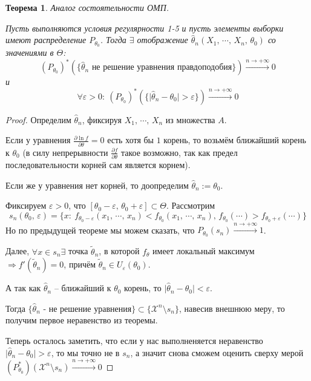 \documentclass[a4paper,12pt]{article}
\theoremstyle{plain}
\newtheorem{theorem}{Теорема}[section]
\theoremstyle{definition}
\theoremstyle{remark}
\begin{document}
\begin{theorem}
  Аналог состоятельности ОМП.

  Пусть выполняются условия регулярности 1-5 и пусть элементы выборки имеют распределение $P_{\theta_0}$. Тогда $\exists$ отображение $\hat{\theta}_n(X_1,\,\cdots,\,X_n,\,\theta_0)$ со значениями в $\Theta$:
  \[
    (P_{\theta_0})^*(\{\hat{\theta}_n \text{ не решение уравнения правдоподобия}\}) \overset{n \to +\infty}{\to} 0
  \]
  и
  \[
    \forall \varepsilon > 0 :\: (P_{\theta_0})^*(\{\vert\hat{\theta}_n - \theta_0\vert > \varepsilon\}) \overset{n \to +\infty}{\to} 0
  \]
\end{theorem}

\begin{proof}
  Определим $\hat{\theta}_n$, фиксируя $X_1,\,\cdots,\,X_n$ из множества $A$.

  Если у уравнения $\frac{\partial\ln f}{\partial\theta} = 0$ есть хотя бы $1$ корень, то возьмём ближайший корень к $\theta_0$ (в силу непрерывности $\frac{\partial f}{\partial \theta}$ такое возможно, так как предел последовательности корней сам является корнем).

  Если же у уравнения нет корней, то доопределим $\hat{\theta}_n := \theta_0$.

  Фиксируем $\varepsilon > 0$, что $[\theta_0 - \varepsilon,\, \theta_0 + \varepsilon] \subset \Theta$. Рассмотрим
  \[
    s_n(\theta_0,\, \varepsilon) = \{x :\: f_{\theta_0 - \varepsilon}(x_1,\,\cdots,\,x_n) < f_{\theta_0}(x_1,\,\cdots,\,x_n),\, f_{\theta_0}(\cdots) > f_{\theta_0 + \varepsilon}(\cdots)\}
  \]
  Но по предыдущей теореме мы можем сказать, что $P_{\theta_0}(s_n) \overset{n \to +\infty}{\to} 1$.

  Далее, $\forall x \in s_n \exists$ точка $\tilde{\theta}_n$, в которой $f_\theta$ имеет локальный максимум $\Rightarrow f'(\tilde{\theta}_n) = 0$, причём $\tilde{\theta}_n \in U_\varepsilon(\theta_0)$.

  А так как $\hat{\theta}_n$ -- ближайший к $\theta_0$ корень, то $\vert\hat{\theta}_n - \theta_0\vert < \varepsilon$.

  Тогда $\{\hat{\theta}_n \text{ - не решение уравнения}\} \subset \{\mathcal{X}^n \setminus s_n\}$, навесив внешнюю меру, то получим первое неравенство из теоремы.

  Теперь осталось заметить, что если у нас выполненяется неравенство $\vert\hat{\theta}_n - \theta_0\vert > \varepsilon$, то мы точно не в $s_n$, а значит снова сможем оценить сверху мерой $(P_{\theta_0}^*)(\mathcal{X}^n \setminus s_n) \overset{n \to +\infty}{\to} 0$
\end{proof}
\end{document}
